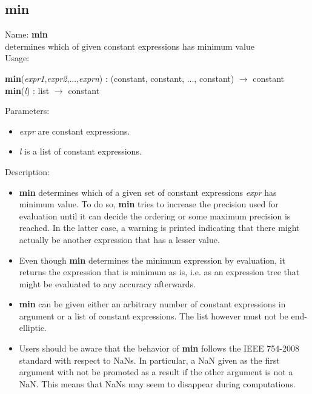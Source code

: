 \subsection{min}
\label{labmin}
\noindent Name: \textbf{min}\\
determines which of given constant expressions has minimum value\\
\noindent Usage: 
\begin{center}
\textbf{min}(\emph{expr1},\emph{expr2},...,\emph{exprn}) : (\textsf{constant}, \textsf{constant}, ..., \textsf{constant}) $\rightarrow$ \textsf{constant}\\
\textbf{min}(\emph{l}) : \textsf{list} $\rightarrow$ \textsf{constant}\\
\end{center}
Parameters: 
\begin{itemize}
\item \emph{expr} are constant expressions.
\item \emph{l} is a list of constant expressions.
\end{itemize}
\noindent Description: \begin{itemize}

\item \textbf{min} determines which of a given set of constant expressions
   \emph{expr} has minimum value. To do so, \textbf{min} tries to increase the
   precision used for evaluation until it can decide the ordering or some
   maximum precision is reached. In the latter case, a warning is printed
   indicating that there might actually be another expression that has a
   lesser value.

\item Even though \textbf{min} determines the minimum expression by evaluation, it 
   returns the expression that is minimum as is, i.e. as an expression
   tree that might be evaluated to any accuracy afterwards.

\item \textbf{min} can be given either an arbitrary number of constant
   expressions in argument or a list of constant expressions. The list
   however must not be end-elliptic.

\item Users should be aware that the behavior of \textbf{min} follows the IEEE
   754-2008 standard with respect to NaNs. In particular, a NaN given as
   the first argument with not be promoted as a result if the other
   argument is not a NaN. This means that NaNs may seem to disappear
   during computations.
\end{itemize}
